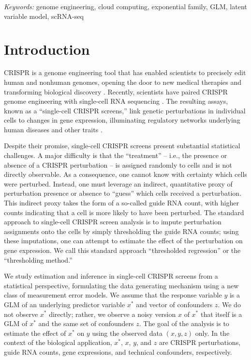 \documentclass[12pt]{article}
\begin{document}
\noindent%
{\it Keywords:} genome engineering, cloud computing, exponential family, GLM, latent variable model, scRNA-seq


\section{Introduction}

CRISPR is a genome engineering tool that has enabled scientists to precisely edit human and nonhuman genomes, opening the door to new medical therapies \parencite{Rothgangl2021,Musunuru2021} and transforming biological discovery \parencite{Przybyla2021}. Recently, scientists have paired CRISPR genome engineering with single-cell RNA sequencing \parencite{Dixit2016,Datlinger2017}. The resulting assays, known as a ``single-cell CRISPR screens,'' link genetic perturbations in individual cells to changes in gene expression, illuminating regulatory networks underlying human diseases and other traits \parencite{Morris2021a}.

Despite their promise, single-cell CRISPR screens present substantial statistical challenges. A major difficulty is that the ``treatment'' -- i.e., the presence or absence of a CRISPR perturbation -- is assigned randomly to cells and is not directly observable. As a consequence, one cannot know with certainty which cells were perturbed. Instead, one must leverage an indirect, quantitative proxy of perturbation presence or absence to ``guess'' which cells received a perturbation. This indirect proxy takes the form of a so-called guide RNA count, with higher counts indicating that a cell is more likely to have been perturbed. The standard approach to single-cell CRISPR screen analysis is to impute perturbation assignments onto the cells by simply thresholding the guide RNA counts; using these imputations, one can attempt to estimate the effect of the perturbation on gene expression. We call this standard approach ``thresholded regression'' or the ``thresholding method.''

We study estimation and inference in single-cell CRISPR screens from a statistical perspective, formulating the data generating mechanism using a new class of measurement error models. We assume that the response variable $y$ is a GLM of an underlying predictor variable $x^*$ and vector of confounders $z$. We do not observe $x^*$ directly; rather, we observe a noisy version $x$ of $x^*$ that itself is a GLM of $x^*$ and the same set of confounders $z$. The goal of the analysis is to estimate the effect of $x^*$ on $y$ using the observed data $(x, y, z)$ only. In the context of the biological application, $x^*$, $x$, $y$, and $z$ are CRISPR perturbations, guide RNA counts, gene expressions, and technical confounders, respectively.
\end{document}

